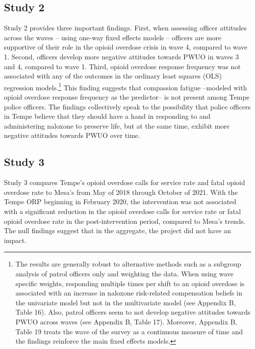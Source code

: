 \subsection{Study 2}
Study 2 provides three important findings. First, when assessing officer attitudes across the waves -- using one-way fixed effects models -- officers are more supportive of their role in the opioid overdose crisis in wave 4, compared to wave 1. Second, officers develop more negative attitudes towards PWUO in waves 3 and 4, compared to wave 1. Third, opioid overdose response frequency was not associated with any of the outcomes in the ordinary least squares (OLS) regression models.\footnote{The results are generally robust to alternative methods such as a subgroup analysis of patrol officers only and weighting the data. When using wave specific weights, responding multiple times per shift to an opioid overdose is associated with an increase in naloxone risk-related compensation beliefs in the univariate model but not in the multivariate model (see Appendix B, Table 16). Also, patrol officers seem to not develop negative attitudes towards PWUO across waves (see Appendix B, Table 17). Moreover, Appendix B, Table 19 treats the wave of the survey as a continuous measure of time and the findings reinforce the main fixed effects models.} This finding suggests that compassion fatigue --modeled with opioid overdose response frequency as the predictor-- is not present among Tempe police officers. The findings collectively speak to the possibility that police officers in Tempe believe that they should have a hand in responding to and administering naloxone to preserve life, but at the same time, exhibit more negative attitudes towards PWUO over time. 

\subsection{Study 3}
Study 3 compares Tempe's opioid overdose calls for service rate and fatal opioid overdose rate to Mesa's from May of 2018 through October of 2021. With the Tempe ORP beginning in February 2020, the intervention was not associated with a significant reduction in the opioid overdose calls for service rate or fatal opioid overdose rate in the post-intervention period, compared to Mesa's trends. The null findings suggest that in the aggregate, the project did not have an impact. 

